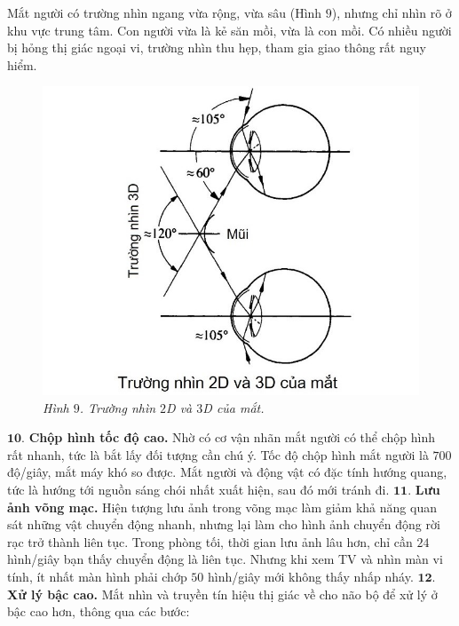 \begin{multicols}{2}
	\vskip 0.1cm
	Mắt người có trường nhìn ngang vừa rộng, vừa sâu (Hình $9$), nhưng chỉ nhìn rõ ở khu vực trung tâm. Con người vừa là kẻ săn mồi, vừa là con mồi. Có nhiều người bị hỏng thị giác ngoại vi, trường nhìn thu hẹp, tham gia giao thông rất nguy hiểm. 
	\begin{figure}[H]
		\vspace*{-5pt}
		\centering
		\captionsetup{labelformat= empty, justification=centering}
		\includegraphics[width= 1\linewidth]{9}
		\caption{\small\textit{\color{timhieukhoahoc}Hình $9$. Trường nhìn $2$D và $3$D của mắt.}}
		\vspace*{-10pt}
	\end{figure}
	$\pmb{10.}$ \textbf{\color{timhieukhoahoc}Chộp hình tốc độ cao.}
	\vskip 0.1cm 
	Nhờ có cơ vận nhãn mắt người có thể chộp hình rất nhanh, tức là bắt lấy đối tượng cần chú ý. Tốc độ chộp hình mắt người là $700$ độ/giây, mắt máy khó so được. 
	\vskip 0.1cm
	Mắt người và động vật có đặc tính hướng quang, tức là hướng tới nguồn sáng chói nhất xuất hiện, sau đó mới tránh đi.  
	\vskip 0.1cm
	$\pmb{11.}$ \textbf{\color{timhieukhoahoc}Lưu ảnh võng mạc.}
	\vskip 0.1cm
	Hiện tượng lưu ảnh trong võng mạc làm giảm khả năng quan sát những vật chuyển động nhanh, nhưng lại làm cho hình ảnh chuyển động rời rạc trở thành liên tục. Trong phòng tối, thời gian lưu ảnh lâu hơn, chỉ cần $24$ hình/giây bạn thấy chuyển động là liên tục. Nhưng khi xem TV và nhìn màn vi tính, ít nhất màn hình phải chớp $50$ hình/giây mới không thấy nhấp nháy.  
	\vskip 0.1cm
	$\pmb{12.}$ \textbf{\color{timhieukhoahoc}Xử lý bậc cao.} Mắt nhìn và truyền tín hiệu thị giác về cho não bộ để xử lý ở bậc cao hơn, thông qua các bước:

\end{multicols}
